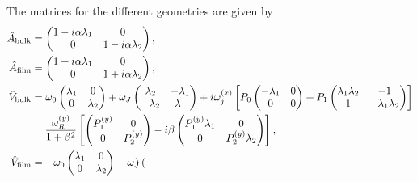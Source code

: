 The matrices for the different geometries are given by
\begin{subequations}
\begin{align}
    \hat{A}_{\text{bulk}} &=
    \begin{pmatrix}
     1-i\alpha\lambda_1 & 0 \\
     0 & 1-i\alpha\lambda_2
    \end{pmatrix}, \label{eq:Abulk}\\
    \hat{A}_{\text{film}} &=
    \begin{pmatrix}
     1+i\alpha\lambda_1 & 0 \\
     0 & 1+i\alpha\lambda_2
    \end{pmatrix}, \label{eq:Afilm}\\
    \nonumber\hat{V}_{\text{bulk}} &=
    \omega_0\begin{pmatrix}
     \lambda_1 & 0 \\
     0 & \lambda_2
    \end{pmatrix}
    + \omega_J \begin{pmatrix}
     \lambda_2 & -\lambda_1 \\
     -\lambda_2 & \lambda_1
    \end{pmatrix}
    + i\omega_j^{(x)}\left[P_0
    \begin{pmatrix}
     -\lambda_1 & 0 \\
     0 & 0
    \end{pmatrix}
    + P_1
    \begin{pmatrix}
     \lambda_1\lambda_2 & -1 \\
     1 & -\lambda_1\lambda_2
    \end{pmatrix}\right] \\
    &\hspace{4.5mm} \frac{\omega_R^{(y)}}{1+\beta^2}\left[
    \begin{pmatrix}
     P_1^{(y)} & 0 \\
     0 & P_2^{(y)}
    \end{pmatrix}
    - i \beta
    \begin{pmatrix}
     P_1^{(y)}\lambda_1 & 0 \\
     0 & P_2^{(y)}\lambda_2
    \end{pmatrix}\right], \label{eq:Vbulk}\\
    \nonumber\hat{V}_{\text{film}} &=
    -\omega_0\begin{pmatrix}
     \lambda_1 & 0 \\
     0 & \lambda_2
    \end{pmatrix}
    - \omega_J \begin{pmatrix}

\end{pmatrix}
\end{align}
\end{subequations}
